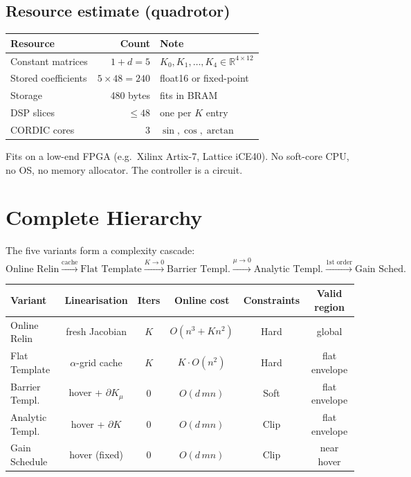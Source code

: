 \documentclass[11pt]{article}
\newcommand{\R}{\mathbb{R}}
\begin{document}
\subsection{Resource estimate (quadrotor)}

\begin{center}
\renewcommand{\arraystretch}{1.3}
\begin{tabular}{@{}l r l@{}}
\toprule
\textbf{Resource} & \textbf{Count} & \textbf{Note} \\
\midrule
Constant matrices & $1 + d = 5$
  & $K_0, K_1, \ldots, K_4 \in \R^{4\times 12}$ \\
Stored coefficients & $5 \times 48 = 240$
  & float16 or fixed-point \\
Storage & 480 bytes & fits in BRAM \\
DSP slices & $\le 48$
  & one per $K$ entry \\
CORDIC cores & 3
  & $\sin, \cos, \arctan$ \\
\bottomrule
\end{tabular}
\end{center}

\noindent
Fits on a low-end FPGA
(e.g.\ Xilinx Artix-7, Lattice iCE40).
No soft-core CPU, no OS, no memory allocator.
The controller is a circuit.

\section{Complete Hierarchy}\label{sec:hierarchy}

The five variants form a complexity cascade:
\begin{equation*}
\text{Online Relin}
\xrightarrow{\text{cache}}
\text{Flat Template}
\xrightarrow{K\to 0}
\text{Barrier Templ.}
\xrightarrow{\mu\to 0}
\text{Analytic Templ.}
\xrightarrow{\text{1st order}}
\text{Gain Sched.}
\end{equation*}

\begin{center}
\renewcommand{\arraystretch}{1.3}
\begin{tabular}{@{}l c c c c c@{}}
\toprule
\textbf{Variant}
  & \textbf{Linearisation}
  & \textbf{Iters}
  & \textbf{Online cost}
  & \textbf{Constraints}
  & \textbf{Valid region} \\
\midrule
Online Relin
  & fresh Jacobian
  & $K$
  & $O(n^3 + Kn^2)$
  & Hard
  & global \\
Flat Template
  & $\alpha$-grid cache
  & $K$
  & $K \cdot O(n^2)$
  & Hard
  & flat envelope \\
Barrier Templ.
  & hover + $\partial K_\mu$
  & 0
  & $O(d\,mn)$
  & Soft
  & flat envelope \\
Analytic Templ.
  & hover + $\partial K$
  & 0
  & $O(d\,mn)$
  & Clip
  & flat envelope \\
Gain Schedule
  & hover (fixed)
  & 0
  & $O(d\,mn)$
  & Clip
  & near hover \\
\bottomrule
\end{tabular}
\end{center}
\end{document}
